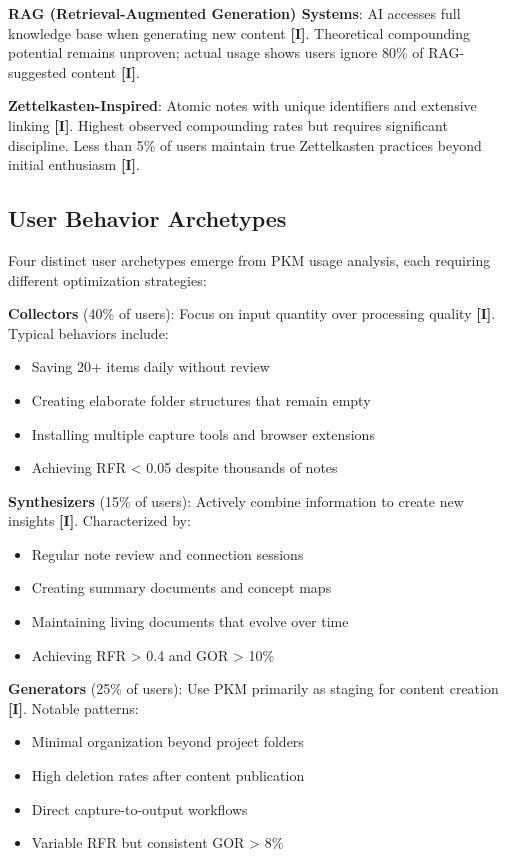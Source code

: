 \documentclass[a4paper,11pt]{article}
\newcommand{\ilabel}{\textbf{\textcolor{icolor}{[I]}}}
\begin{document}
\textbf{RAG (Retrieval-Augmented Generation) Systems}: AI accesses full knowledge base when generating new content \ilabel{}. Theoretical compounding potential remains unproven; actual usage shows users ignore 80\% of RAG-suggested content \ilabel{}.


\textbf{Zettelkasten-Inspired}: Atomic notes with unique identifiers and extensive linking \ilabel{}. Highest observed compounding rates but requires significant discipline. Less than 5\% of users maintain true Zettelkasten practices beyond initial enthusiasm \ilabel{}.


\subsection{User Behavior Archetypes}

Four distinct user archetypes emerge from PKM usage analysis, each requiring different optimization strategies:


\textbf{Collectors} (40\% of users): Focus on input quantity over processing quality \ilabel{}. Typical behaviors include:

\begin{itemize}
  \item Saving 20+ items daily without review
  \item Creating elaborate folder structures that remain empty
  \item Installing multiple capture tools and browser extensions
  \item Achieving RFR < 0.05 despite thousands of notes
\end{itemize}

\textbf{Synthesizers} (15\% of users): Actively combine information to create new insights \ilabel{}. Characterized by:

\begin{itemize}
  \item Regular note review and connection sessions
  \item Creating summary documents and concept maps
  \item Maintaining living documents that evolve over time
  \item Achieving RFR > 0.4 and GOR > 10\%
\end{itemize}

\textbf{Generators} (25\% of users): Use PKM primarily as staging for content creation \ilabel{}. Notable patterns:

\begin{itemize}
  \item Minimal organization beyond project folders
  \item High deletion rates after content publication
  \item Direct capture-to-output workflows
  \item Variable RFR but consistent GOR > 8\%
\end{itemize}
\end{document}

